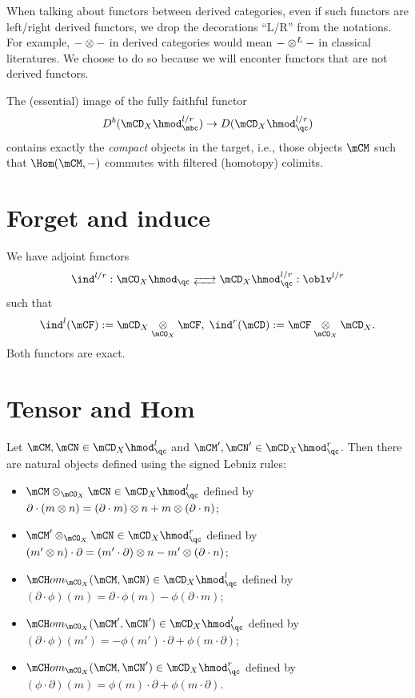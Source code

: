 	When talking about functors between derived categories, even if such functors are left/right derived functors, we drop the decorations ``L/R'' from the notations. For example, $-\ot - $ in derived categories would mean $-\ot^L -$ in classical literatures. We choose to do so because we will enconter functors that are not derived functors.

	\begin{rem}
		The (essential) image of the fully faithful functor 
		\[
			D^b(\mCD_X\hmod_\mbc^{l/r}) \to D(\mCD_X\hmod_\qc^{l/r})
		\]
		contains exactly the \emph{compact} objects in the target, i.e., those objects $\mCM$ such that $\Hom(\mCM,-)$ commutes with filtered (homotopy) colimits.


	\end{rem}

\section{Forget and induce}

	\begin{constr}
		We have adjoint functors
		\[
			 \ind^{l/r}: \mCO_X\hmod_\qc \adj \mCD_X \hmod_\qc^{l/r} : \oblv^{l/r} 
 		\]
 		such that
 		\[
 			\ind^l( \mCF ) := \mCD_X\ot_{\mCO_X} \mCF,\; \ind^r(\mCD):= \mCF \ot_{\mCO_X} \mCD_X.
 		\]
 		Both functors are exact.
	\end{constr}

\section{Tensor and Hom}
	
	\begin{constr}
		\label{constr-tensor-Hom}
		Let $\mCM, \mCN \in \mCD_X\hmod_\qc^l$ and  $\mCM', \mCN' \in \mCD_X\hmod_\qc^r$. Then there are natural objects defined using the signed Lebniz rules: 
		\begin{itemize}
			\item 
				$\mCM \ot_{\mCO_X} \mCN \in \mCD_X\hmod_\qc^l$ defined by $\partial\cdot (m\ot n) = (\partial\cdot m) \ot n + m \ot (\partial\cdot n)$;
			\item 
				$\mCM' \ot_{\mCO_X} \mCN \in \mCD_X\hmod_\qc^r$ defined by $ (m'\ot n)\cdot \partial = (m' \cdot \partial)\ot n  - m'\ot(\partial \cdot n) $;
			\item
				$\mCH om_{\mCO_X}(\mCM,\mCN) \in \mCD_X\hmod_\qc^l$ defined by $(\partial\cdot \phi)(m) = \partial \cdot \phi(m) - \phi( \partial \cdot m )$;
			\item
				$\mCH om_{\mCO_X}(\mCM',\mCN') \in \mCD_X\hmod_\qc^l$ defined by $(\partial\cdot \phi)(m') = -\phi(m')\cdot \partial + \phi(  m \cdot \partial )$;
			\item
				$\mCH om_{\mCO_X}(\mCM,\mCN') \in \mCD_X\hmod_\qc^r$ defined by $(\phi\cdot \partial)(m) = \phi(m)\cdot \partial + \phi(  m \cdot \partial )$.
		\end{itemize}
	\end{constr}

